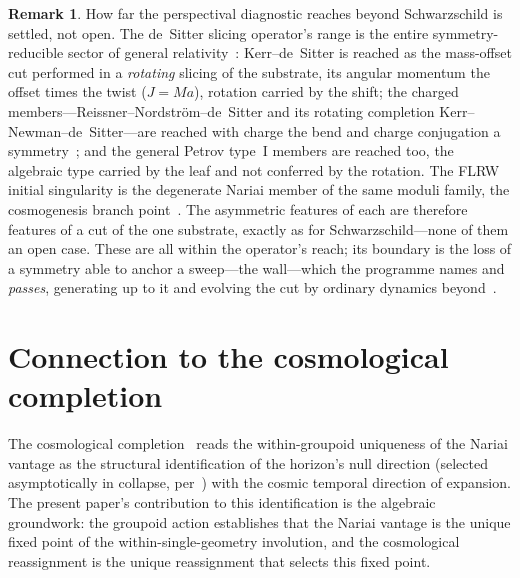 \documentclass[11pt,a4paper]{article}
\theoremstyle{definition}
\newtheorem{remark}[theorem]{Remark}
\begin{document}
\begin{remark}\label{rem:wider}
How far the perspectival diagnostic reaches beyond Schwarzschild is settled, not open. The de~Sitter slicing operator's range is the entire symmetry-reducible sector of general relativity~\cite{JanzenRange}: Kerr--de~Sitter is reached as the mass-offset cut performed in a \emph{rotating} slicing of the substrate, its angular momentum the offset times the twist ($J=Ma$), rotation carried by the shift; the charged members---Reissner--Nordstr\"om--de~Sitter and its rotating completion Kerr--Newman--de~Sitter---are reached with charge the bend and charge conjugation a symmetry~\cite{JanzenSlicing,JanzenRange}; and the general Petrov type~I members are reached too, the algebraic type carried by the leaf and not conferred by the rotation. The FLRW initial singularity is the degenerate Nariai member of the same moduli family, the cosmogenesis branch point~\cite{JanzenRange,JanzenCosmogenesis}. The asymmetric features of each are therefore features of a cut of the one substrate, exactly as for Schwarzschild---none of them an open case. These are all within the operator's reach; its boundary is the loss of a symmetry able to anchor a sweep---the wall---which the programme names and \emph{passes}, generating up to it and evolving the cut by ordinary dynamics beyond~\cite{JanzenRange}.
\end{remark}

\section{Connection to the cosmological completion}\label{sec:cosmology}

The cosmological completion~\cite{JanzenCRframework} reads the within-groupoid uniqueness of the Nariai vantage as the structural identification of the horizon's null direction (selected asymptotically in collapse, per~\cite{JanzenBHcausality}) with the cosmic temporal direction of expansion. The present paper's contribution to this identification is the algebraic groundwork: the groupoid action establishes that the Nariai vantage is the unique fixed point of the within-single-geometry involution, and the cosmological reassignment is the unique reassignment that selects this fixed point.
\end{document}
